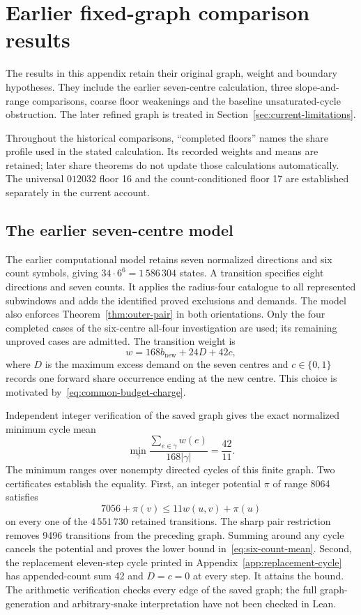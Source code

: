 \documentclass[11pt,a4paper]{article}
\theoremstyle{definition}
\theoremstyle{remark}
\begin{document}
\appendix
\section{Earlier fixed-graph comparison results}\label{app:historical-comparisons}
The results in this appendix retain their original graph, weight and boundary
hypotheses. They include the earlier seven-centre calculation, three
slope-and-range comparisons, coarse floor weakenings and the baseline
unsaturated-cycle obstruction. The later refined graph is treated in
Section~\ref{sec:current-limitations}.

Throughout the historical comparisons, ``completed floors'' names the
share profile used in the stated calculation. Its recorded weights and
means are retained; later share theorems do not update those calculations
automatically. The universal $012032$ floor 16 and the count-conditioned
floor 17 are established separately in the current account.

\subsection{The earlier seven-centre model}
The earlier computational model retains seven normalized directions and six count symbols, giving $34\cdot6^6=1\,586\,304$ states. A transition specifies eight directions and seven counts. It applies the radius-four catalogue to all represented subwindows and adds the identified proved exclusions and demands. The model also enforces Theorem~\ref{thm:outer-pair} in both orientations. Only the four completed cases of the six-centre all-four investigation are used; its remaining unproved cases are admitted. The transition weight is
\[
w=168b_{\mathrm{new}}+24D+42c,
\]
where $D$ is the maximum excess demand on the seven centres and $c\in\{0,1\}$ records one forward share occurrence ending at the new centre. This choice is motivated by~\eqref{eq:common-budget-charge}.

Independent integer verification of the saved graph gives the exact normalized minimum cycle mean
\begin{equation}\label{eq:six-count-mean}
\min_{\gamma}\frac{\sum_{e\in\gamma}w(e)}{168|\gamma|}=\frac{42}{11}.
\end{equation}
The minimum ranges over nonempty directed cycles of this finite graph. Two certificates establish the equality. First, an integer potential $\pi$ of range 8064 satisfies
\[
7056+\pi(v)\le11w(u,v)+\pi(u)
\]
on every one of the $4\,551\,730$ retained transitions. The sharp pair restriction removes 9496 transitions from the preceding graph. Summing around any cycle cancels the potential and proves the lower bound in~\eqref{eq:six-count-mean}. Second, the replacement eleven-step cycle printed in Appendix~\ref{app:replacement-cycle} has appended-count sum 42 and $D=c=0$ at every step. It attains the bound. The arithmetic verification checks every edge of the saved graph; the full graph-generation and arbitrary-snake interpretation have not been checked in Lean.
\end{document}
